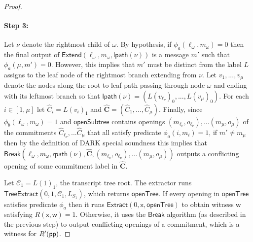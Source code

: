 \begin{proof}
\paragraph{Step 3:}  Let $\nu$ denote the rightmost child of $\omega$. By hypothesis, if $\phi_a(\ell_\omega, m_\omega) = 0$ then the final output of $\textsf{Extend}(\ell_\omega, m_\omega, \textsf{lpath}(\nu))$ is a message $m'$ such that $\phi_a(\mu, m') = 0$. However, this implies that $m'$ must be distinct from the label $L$ assigns to the leaf node of the rightmost branch extending from $\nu$. Let $v_1,...,v_\mu$ denote the nodes along the root-to-leaf path passing through node $\omega$ and ending with its leftmost branch so that $\textsf{lpath}(\nu) = (L(v_{\ell_\nu})_0,...,L(v_\mu)_0)$. For each $i \in [1, \mu]$ let $\hat{C}_i = L(v_i)_1$ and $\mathbf{\hat{C}} = (\hat{C}_1,...,\hat{C}_\mu)$. Finally, since $\phi_b(\ell_\omega, m_\omega) = 1$ and $\textsf{openSubtree}$ contains openings $(m_{\ell_\nu}, o_{\ell_\nu}),...(m_\mu, o_\mu)$ of the commitments $\hat{C}_{\ell_\nu},...\hat{C}_\mu$ that all satisfy predicate $\phi_a(i, m_i) = 1$, if $m' \neq m_\mu$ then by the definition of DARK special soundness this implies that $\textsf{Break}(\ell_\omega, m_\omega,  \textsf{rpath}(\nu), \mathbf{\hat{C}}, (m_{\ell_\nu}, o_{\ell_\nu}),...(m_{\mu}, o_{\mu}))$ outputs a conflicting opening of some commitment label in $\mathbf{\hat{C}}$. 




Let $\mathcal{C}_1 = L(1)_1$, the transcript tree root. The extractor runs $\textsf{TreeExtract}(0, 1, \mathcal{C}_1, L_{S_1})$, which returns $\textsf{openTree}$. If every opening in $\textsf{openTree}$ satisfies predicate $\phi_a$ then it runs $\textsf{Extract}(0, \mathsf{x}, \textsf{openTree})$ to obtain witness $\mathsf{w}$ satisfying $R(\mathsf{x}, \mathsf{w}) = 1$. Otherwise, it uses the $\textsf{Break}$ algorithm (as described in the previous step) to output conflicting openings of a commitment, which is a witness for $R'(\textsf{pp})$.
	
\end{proof}


